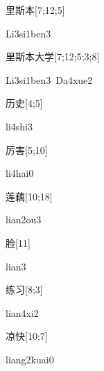 \begin{verbete}[Li3si1ben3]{里斯本}[7;12;5]
\begin{pronuncia}{Li3si1ben3}
\end{pronuncia}
\end{verbete}

\begin{verbete}{里斯本大学}[7;12;5;3;8]
\begin{pronuncia}[\\]{Li3si1ben3\ Da4xue2}
\end{pronuncia}
\end{verbete}

\begin{verbete}[li4shi3]{历史}[4;5]
\begin{pronuncia}{li4shi3}
\end{pronuncia}
\end{verbete}

\begin{verbete}[li4hai0]{厉害}[5;10]
\begin{pronuncia}{li4hai0}
\end{pronuncia}
\end{verbete}

\begin{verbete}[lian2ou3]{莲藕}[10;18]
\begin{pronuncia}{lian2ou3}
\end{pronuncia}
\end{verbete}

\begin{verbete}[lian3]{脸}[11]
\begin{pronuncia}{lian3}
\end{pronuncia}
\end{verbete}

\begin{verbete}[lian4xi2]{练习}[8;3]
\begin{pronuncia}{lian4xi2}
\end{pronuncia}
\end{verbete}

\begin{verbete}{凉快}[10;7]
\begin{pronuncia}{liang2kuai0}
\end{pronuncia}
\end{verbete}

